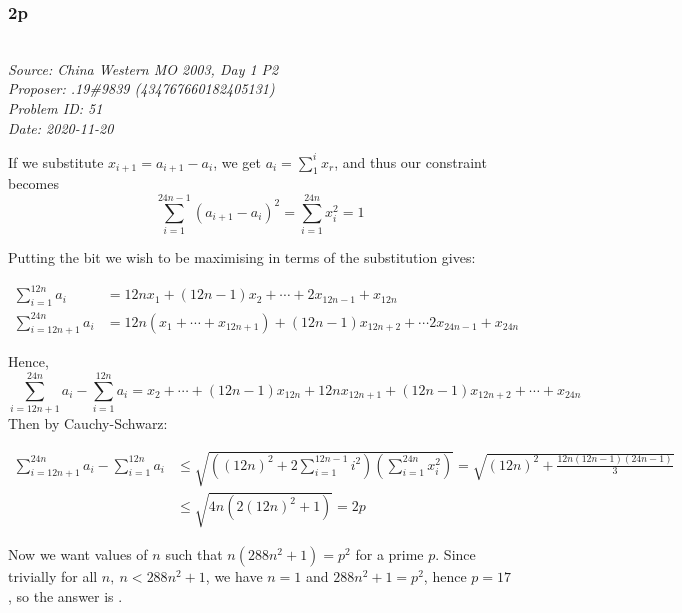 \documentclass[titlepage=true]{scrartcl}
\begin{document}
\newpage 

\subsubsection{2p}

\SSbreak\\
\emph{Source: China Western MO 2003, Day 1 P2}\\
\emph{Proposer: .19\#9839 (434767660182405131)}\\
\emph{Problem ID: 51}\\
\emph{Date: 2020-11-20}\\
\SSbreak

\bigskip

\begin{solution}\hfil\medskip

    If we substitute \(x_{i+1}=a_{i+1}-a_i\), we get \(a_i=\sum_1^i x_r\), and thus our constraint becomes 
    \begin{equation*}
        \sum_{i=1}^{24n-1}(a_{i+1}-a_i)^2=\sum_{i=1}^{24n}x^2_i=1
    \end{equation*}
    
    Putting the bit we wish to be maximising in terms of the substitution gives:

    \begin{align*}
        \sum_{i=1}^{12n}a_i&=12nx_1+(12n-1)x_2+\cdots+2x_{12n-1}+x_{12n}\\
        \sum_{i=12n+1}^{24n}a_i&=12n(x_1+\cdots+x_{12n+1})+(12n-1)x_{12n+2}+\cdots 2x_{24n-1}+x_{24n}
    \end{align*}

    Hence, 
    \begin{equation*}
        \sum_{i=12n+1}^{24n}a_i-\sum_{i=1}^{12n}a_i=x_2+\cdots+(12n-1)x_{12n}+12nx_{12n+1}+(12n-1)x_{12n+2}+\cdots+x_{24n}
    \end{equation*}
    Then by Cauchy-Schwarz: 

    \begin{align*}
        \sum_{i=12n+1}^{24n}a_i-\sum_{i=1}^{12n}a_i&\leq \sqrt{\left((12n)^2+2\sum_{i=1}^{12n-1}i^2\right)\left(\sum_{i=1}^{24n}x_i^2\right)}=\sqrt{(12n)^2+\frac{12n(12n-1)(24n-1)}{3}}\\
        &\leq\sqrt{4n(2(12n)^2+1)}=2p
    \end{align*}

    Now we want values of \(n\) such that \(n(288n^2+1)=p^2\) for a prime \(p\). Since trivially for all \(n,\ n<288n^2+1\), we have \(n=1\) and \(288n^2+1=p^2\), hence \(p=17\), so the answer is .
\end{solution}
\end{document}
